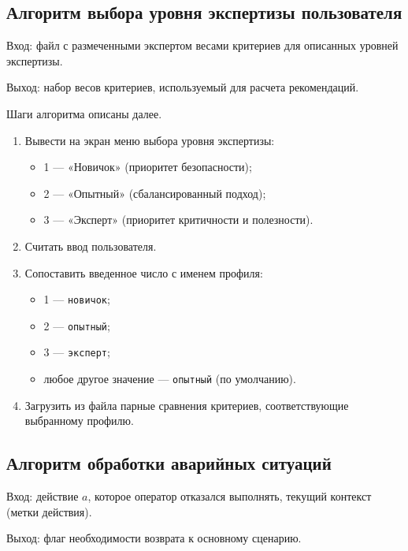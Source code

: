 \subsection{Алгоритм выбора уровня экспертизы пользователя}

Вход: файл с размеченными экспертом весами критериев для описанных уровней экспертизы.

Выход: набор весов критериев, используемый для расчета рекомендаций.

Шаги алгоритма описаны далее.
\begin{enumerate}
    \item Вывести на экран меню выбора уровня экспертизы:
        \begin{itemize}
            \item 1 — «Новичок» (приоритет безопасности);
            \item 2 — «Опытный» (сбалансированный подход);
            \item 3 — «Эксперт» (приоритет критичности и полезности).
        \end{itemize}
    \item Считать ввод пользователя.
    \item Сопоставить введенное число с именем профиля:
        \begin{itemize}
            \item 1 --- \texttt{новичок};
            \item 2 --- \texttt{опытный};
            \item 3 --- \texttt{эксперт};
            \item любое другое значение --- \texttt{опытный} (по умолчанию).
        \end{itemize}
    \item Загрузить из файла парные сравнения критериев, соответствующие выбранному профилю.
\end{enumerate}

\subsection{Алгоритм обработки аварийных ситуаций}

Вход: действие \(a\), которое оператор отказался выполнять, текущий контекст (метки действия).

Выход: флаг необходимости возврата к основному сценарию.

